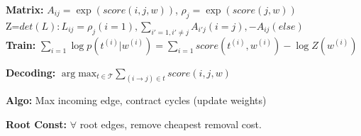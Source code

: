 \textbf{Matrix:} $A_{ij} = \exp(score(i,j,w))$, $\rho_j = \exp(score(j,w))$\\
Z=$det(L): L_{ij}=\rho_j (i=1), \sum_{i'=1, i' \neq j} A_{i'j} (i=j), -A_{ij} (else)$\\
\textbf{Train:} $\sum_{i=1} \log p(t^{(i)}| w^{(i)}) = \sum_{i=1} score(t^{(i)}, w^{(i)}) - \log Z(w^{(i)})$\\
\begin{comment}
	$\rho$ is the root score.\\
	Calculating the normalizer over $O(n^n)$ trees reduces to the calculation of the determinant of L in $O(n^3)$.
	Training such a probabilistic non-projective parser is done by optimizing the log-likelihood $\sum score(t^{(i)}, w^{(i)}) - \log Z(w^{(i)})$ \\
\end{comment} 

\textbf{Decoding:} $\arg \text{max}_{t \in \mathcal{T}} \sum_{(i \rightarrow j) \in t} score(i,j,w)$\\
\begin{comment}
	All words are present as a node (fully connected). The root node has a connection to all nodes. Each connection is weighted.
	The goal is to find the maximum-weight directed spanning tree subject to a root constraint.
	All root nodes must have exactly one incoming edge, no cycles allowed, only one outgoing edge from the root.\\
\end{comment}

\textbf{Algo:} Max incoming edge, contract cycles (update weights)\\
\begin{comment}
	Greedily picking the maximum weighted edge wich is not creating a circle works only in the undirected case. In the directed case it fails, proof by counter example.\\
	Use the maximum incoming edge of each node, if they form a tree, we have a MST. If not, there is a cycle. 
	Contract The cycle by combining it to one huge node, with the incoming edges weights adjusted to the weights of the internal edges of the broken cycle. Algorithm runs in $O(n^2)$\\
\end{comment} 

\textbf{Root Const:} $\forall$ root edges, remove cheapest removal cost.\\
\begin{comment}
	If we have two edges from the root, we take a look at where they are pointing to. For each edge, we compare it to all other incoming weights of the destination, and take the difference. Thats what we loose by removing this edge. We remove the lowest cost edge and contract if necessary.\\
\end{comment} 









